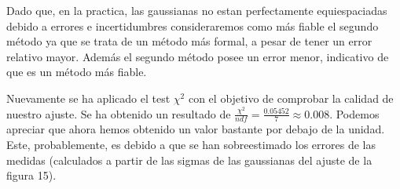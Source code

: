 \begin{enumerate}
Dado que, en la practica, las gaussianas no estan perfectamente equiespaciadas debido a errores e incertidumbres consideraremos como más fiable el segundo método ya que se trata de un método más formal, a pesar de tener un error relativo mayor. Además el segundo método posee un error menor, indicativo de que es un método más fiable.

Nuevamente se ha aplicado el test $\chi^2$ con el objetivo de comprobar la calidad de nuestro ajuste. Se ha obtenido un resultado de $\frac{\chi^2}{ndf}=\frac{0.05452}{7}\approx 0.008$. Podemos apreciar que ahora hemos obtenido un valor bastante por debajo de la unidad. Este, probablemente, es debido a que se han sobreestimado los errores de las medidas (calculados a partir de las sigmas de las gaussianas del ajuste de la figura 15).

\end{enumerate}